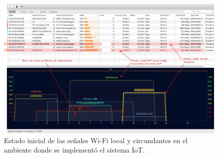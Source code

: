\begin{landscape} %
\begin{figure}[htpb]
\centering 
\includegraphics[width=1.5\textwidth]{./Figures/wifi/01.png}
\caption{Estado inicial de las señales Wi-Fi local y circundantes en el ambiente donde se implementó el sistema IoT.}
\label{fig:test01}
\end{figure}
\end{landscape} %









